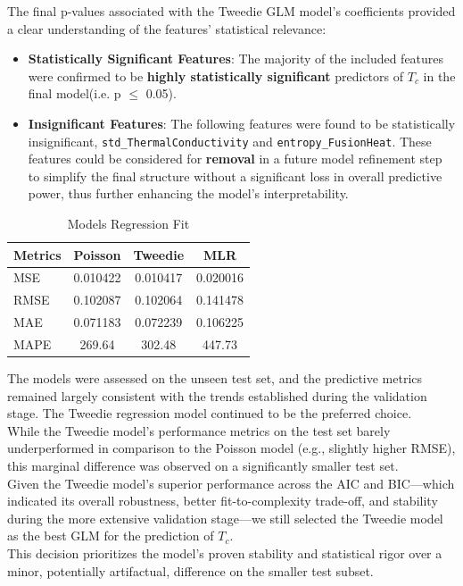 \documentclass[conference]{IEEEtran}
\begin{document}
The final p-values associated with the Tweedie GLM model's coefficients provided a clear understanding of the features' statistical relevance:
\begin{itemize}
	\item \textbf{Statistically Significant Features}: The majority of the included features were confirmed to be \textbf{highly statistically significant} predictors of $T_c$ in the final model(i.e. p $\leq$ 0.05).
	\item \textbf{Insignificant Features}: The following features were found to be statistically insignificant, \texttt{std\_ThermalConductivity} and \texttt{entropy\_FusionHeat}. These features could be considered for \textbf{removal} in a future model refinement step to simplify the final structure without a significant loss in overall predictive power, thus further enhancing the model's interpretability.\\
\end{itemize}
\begin{table}[h!]
	\centering
	\caption{Models Regression Fit}
	\footnotesize
	\label{tab:regression_fit_results}
	\begin{tabular}{|l|c|c|c|}
		\hline
		\textbf{Metrics} & \textbf{Poisson} & \textbf{Tweedie} & \textbf{MLR} \\
		\hline
		MSE & 0.010422 & 0.010417 & 0.020016 \\
		\hline
		RMSE & 0.102087 & 0.102064 & 0.141478 \\
		\hline
		MAE & 0.071183 & 0.072239 & 0.106225 \\
		\hline
		MAPE & 269.64 & 302.48 & 447.73 \\
		\hline
	\end{tabular}
\end{table}

\indent The models were assessed on the unseen test set, and the predictive metrics remained largely consistent with the trends established during the validation stage. The Tweedie regression model continued to be the preferred choice.\\
\indent While the Tweedie model's performance metrics on the test set barely underperformed in comparison to the Poisson model (e.g., slightly higher RMSE), this marginal difference was observed on a significantly smaller test set.\\
\indent Given the Tweedie model's superior performance across the AIC and BIC—which indicated its overall robustness, better fit-to-complexity trade-off, and stability during the more extensive validation stage—we still selected the Tweedie model as the best GLM for the prediction of $T_c$.\\
\indent This decision prioritizes the model's proven stability and statistical rigor over a minor, potentially artifactual, difference on the smaller test subset.
\end{document}

